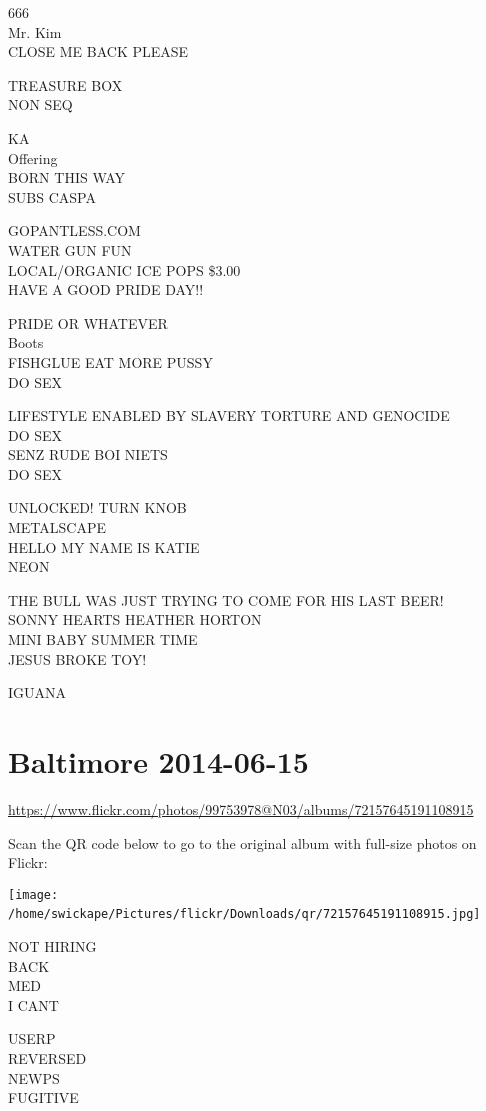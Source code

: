 \documentclass[10pt,letterpaper]{article}
\begin{document}
666\\
Mr. Kim\\
CLOSE ME BACK PLEASE

TREASURE BOX\\
NON SEQ

KA\\
Offering\\
BORN THIS WAY\\
SUBS CASPA

GOPANTLESS.COM\\
WATER GUN FUN\\
LOCAL/ORGANIC ICE POPS \$3.00\\
HAVE A GOOD PRIDE DAY!!

PRIDE OR WHATEVER\\
Boots\\
FISHGLUE EAT MORE PUSSY\\
DO SEX

LIFESTYLE ENABLED BY SLAVERY TORTURE AND GENOCIDE\\
DO SEX\\
SENZ RUDE BOI NIETS\\
DO SEX

UNLOCKED!  TURN KNOB\\
METALSCAPE\\
HELLO MY NAME IS KATIE\\
NEON

THE BULL WAS JUST TRYING TO COME FOR HIS LAST BEER!\\
SONNY HEARTS HEATHER HORTON\\
MINI BABY SUMMER TIME\\
JESUS BROKE TOY!

IGUANA
\

\section*{Baltimore 2014-06-15}

\url{https://www.flickr.com/photos/99753978@N03/albums/72157645191108915}

Scan the QR code below to go to the original album with full-size photos on Flickr:

\texttt{[image: /home/swickape/Pictures/flickr/Downloads/qr/72157645191108915.jpg]}
\

NOT HIRING\\
BACK\\
MED\\
I CANT

USERP\\
REVERSED\\
NEWPS\\
FUGITIVE
\end{document}
